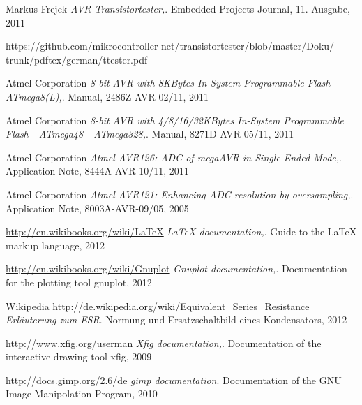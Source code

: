 \documentclass[pdftex,12pt,a4paper,oneside,english]{report}
\begin{document}












 
 
 
 
 
 






\begin{thebibliography}{99}

Markus Frejek
\emph{AVR-Transistortester,}.
Embedded Projects Journal,
11. Ausgabe,
2011

https://github.com/mikrocontroller-net/transistortester/blob/master/Doku/
trunk/pdftex/german/ttester.pdf

Atmel Corporation
\emph{8-bit AVR with 8KBytes In-System Programmable Flash - ATmega8(L),}.
Manual,
2486Z-AVR-02/11,
2011

Atmel Corporation
\emph{8-bit AVR with 4/8/16/32KBytes In-System Programmable Flash - ATmega48 - ATmega328,}.
Manual,
8271D-AVR-05/11,
2011

Atmel Corporation
\emph{Atmel AVR126: ADC of megaAVR in Single Ended Mode,}.
Application Note,
8444A-AVR-10/11,
2011

Atmel Corporation
\emph{Atmel AVR121: Enhancing ADC resolution by oversampling,}.
Application Note,
8003A-AVR-09/05,
2005

\url{http://en.wikibooks.org/wiki/LaTeX}
\emph{LaTeX documentation,}.
Guide to the LaTeX markup language,
2012

\url{http://en.wikibooks.org/wiki/Gnuplot}
\emph{Gnuplot documentation,}.
Documentation for the plotting tool gnuplot,
2012

Wikipedia
\url{http://de.wikipedia.org/wiki/Equivalent_Series_Resistance}
\emph{Erläuterung zum ESR}.
Normung und Ersatzschaltbild eines Kondensators,
2012

\url{http://www.xfig.org/userman}
\emph{Xfig documentation,}.
Documentation of the interactive drawing tool xfig,
2009

\url{http://docs.gimp.org/2.6/de}
\emph{gimp documentation}.
Documentation of the GNU Image Manipolation Program,
2010


\end{thebibliography}
\end{document}
